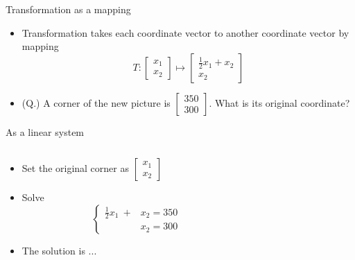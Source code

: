 \documentclass{beamer}
\theoremstyle{definition}
\theoremstyle{theorem}
\begin{document}
\begin{frame}
 {Transformation as a mapping}
 
\begin{itemize}
 \item Transformation takes each coordinate vector to another coordinate vector by mapping
 $$ T:
\begin{bmatrix}
 x_{1}\\x_{2}
\end{bmatrix}
\mapsto 
\begin{bmatrix}
 \frac 1 2 x_{1} + x_{2}
 \\x_{2}
\end{bmatrix}
$$

\item (Q.) 
A corner of the new picture is
$\begin{bmatrix}
 350\\ 300
\end{bmatrix}$.
What is its original coordinate?
\end{itemize}
\end{frame}



 \begin{frame}{As a linear system}
\begin{columns}
    \begin{column}{0.5\textwidth}
        
\begin{itemize}
 \item Set the original corner as 
 $\begin{bmatrix}
 x_{1}\\x_{2}
\end{bmatrix}$
\item Solve
\begin{equation*}
 \label{eq:01}
\left\{
\begin{array}
 {ll}
\frac 1 2 x_{1}  \ + & x_{2} = 350 \\
& x_{2} = 300
\end{array}
\right.
\end{equation*}
 \item The solution is ...
\end{itemize}   
\end{column}
    \begin{column}{0.5\textwidth}
    \end{column}
\end{columns}
\end{frame}
\end{document}

